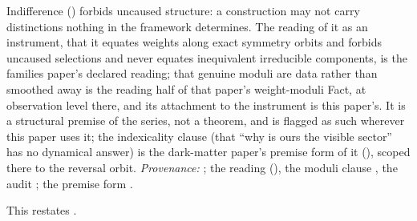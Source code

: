 Indifference () forbids uncaused structure: a construction may not carry distinctions nothing in the framework determines. The reading of it as an instrument, that it equates weights along exact symmetry orbits and forbids uncaused selections and never equates inequivalent irreducible components, is the families paper's declared reading; that genuine moduli are data rather than smoothed away is the reading half of that paper's weight-moduli Fact, at observation level there, and its attachment to the instrument is this paper's. It is a structural premise of the series, not a theorem, and is flagged as such wherever this paper uses it; the indexicality clause (that ``why is ours the visible sector'' has no dynamical answer) is the dark-matter paper's premise form of it (), scoped there to the reversal orbit. \emph{Provenance:} \cite[Principle~5.4]{ButlerT8}; the reading \cite[Fact~2.5]{ButlerT13} (), the moduli clause \cite[Fact~2.4]{ButlerT13}, the audit \cite[\S5]{ButlerT13}; the premise form \cite[Premise~2.2]{ButlerT14}.

This restates .
